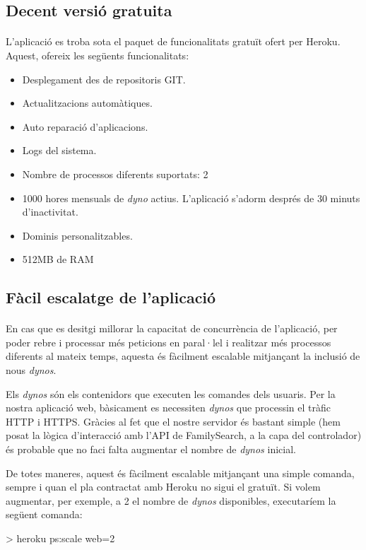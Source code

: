    \subsection{Decent versió gratuita}

    \paragraph{}
    L'aplicació es troba sota el paquet de funcionalitats gratuït ofert per Heroku. Aquest, ofereix les següents funcionalitats:

    \begin{itemize}
        \item Desplegament des de repositoris GIT.
        \item Actualitzacions automàtiques.
        \item Auto reparació d'aplicacions.
        \item Logs del sistema.
        \item Nombre de processos diferents suportats: 2
        \item 1000 hores mensuals de \emph{dyno} actius. L'aplicació s'adorm després de 30 minuts d'inactivitat.
        \item Dominis personalitzables.
        \item 512MB de RAM
    \end{itemize}


    \subsection{Fàcil escalatge de l'aplicació}

    \paragraph{}
    En cas que es desitgi millorar la capacitat de concurrència de l'aplicació, per poder rebre i processar més peticions en paral·lel i realitzar més processos diferents al mateix temps, aquesta és fàcilment escalable mitjançant la inclusió de nous \emph{dynos}.

    Els \emph{dynos} són els contenidors que executen les comandes dels usuaris. Per la nostra aplicació web, bàsicament es necessiten \emph{dynos} que processin el tràfic HTTP i HTTPS. Gràcies al fet que el nostre servidor és bastant simple (hem posat la lògica d'interacció amb l'API de FamilySearch, a la capa del controlador) és probable que no faci falta augmentar el nombre de \emph{dynos} inicial.

    De totes maneres, aquest és fàcilment escalable mitjançant una simple comanda, sempre i quan el pla contractat amb Heroku no sigui el gratuït. Si volem augmentar, per exemple, a 2 el nombre de \emph{dynos} disponibles, executaríem la següent comanda:

    \begin{displayquote}
        > heroku ps:scale web=2
    \end{displayquote}
